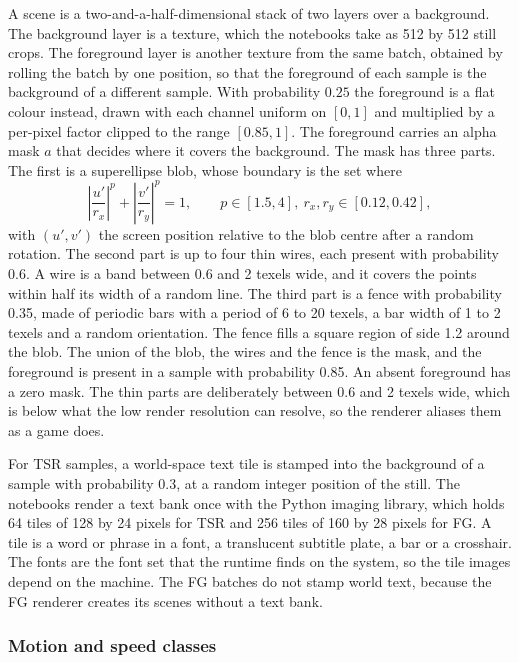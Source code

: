 A scene is a two-and-a-half-dimensional stack of two layers over a background. The background layer is a texture, which the notebooks take as 512 by 512 still crops. The foreground layer is another texture from the same batch, obtained by rolling the batch by one position, so that the foreground of each sample is the background of a different sample. With probability $0.25$ the foreground is a flat colour instead, drawn with each channel uniform on $[0,1]$ and multiplied by a per-pixel factor clipped to the range $[0.85,1]$. The foreground carries an alpha mask $a$ that decides where it covers the background. The mask has three parts. The first is a superellipse blob, whose boundary is the set where
\begin{equation}
\left|\frac{u'}{r_x}\right|^{p}+\left|\frac{v'}{r_y}\right|^{p}=1,\qquad p\in[1.5,4],\ r_x,r_y\in[0.12,0.42],\label{eq:data-alpha}
\end{equation}
with $(u',v')$ the screen position relative to the blob centre after a random rotation. The second part is up to four thin wires, each present with probability 0.6. A wire is a band between 0.6 and 2 texels wide, and it covers the points within half its width of a random line. The third part is a fence with probability 0.35, made of periodic bars with a period of 6 to 20 texels, a bar width of 1 to 2 texels and a random orientation. The fence fills a square region of side 1.2 around the blob. The union of the blob, the wires and the fence is the mask, and the foreground is present in a sample with probability 0.85. An absent foreground has a zero mask. The thin parts are deliberately between 0.6 and 2 texels wide, which is below what the low render resolution can resolve, so the renderer aliases them as a game does.

For TSR samples, a world-space text tile is stamped into the background of a sample with probability 0.3, at a random integer position of the still. The notebooks render a text bank once with the Python imaging library, which holds 64 tiles of 128 by 24 pixels for TSR and 256 tiles of 160 by 28 pixels for FG. A tile is a word or phrase in a font, a translucent subtitle plate, a bar or a crosshair. The fonts are the font set that the runtime finds on the system, so the tile images depend on the machine. The FG batches do not stamp world text, because the FG renderer creates its scenes without a text bank.

\subsubsection{Motion and speed classes}\label{sec:data-synth-motion}


